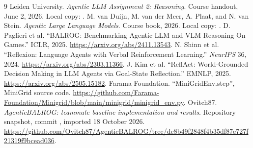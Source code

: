 \documentclass[11pt,a4paper]{article}
\begin{document}
\begin{thebibliography}{9}
 Leiden University. \emph{Agentic LLM Assignment 2: Reasoning}. Course handout, June 2, 2026. Local copy: .
 M. van Duijn, M. van der Meer, A. Plaat, and N. van Stein. \emph{Agentic Large Language Models}. Course book, 2026. Local copy: .
 D. Paglieri et al. ``BALROG: Benchmarking Agentic LLM and VLM Reasoning On Games.'' ICLR, 2025. \url{https://arxiv.org/abs/2411.13543}.
 N. Shinn et al. ``Reflexion: Language Agents with Verbal Reinforcement Learning.'' \emph{NeurIPS} 36, 2024. \url{https://arxiv.org/abs/2303.11366}.
 J. Kim et al. ``ReflAct: World-Grounded Decision Making in LLM Agents via Goal-State Reflection.'' EMNLP, 2025. \url{https://arxiv.org/abs/2505.15182}.
 Farama Foundation. ``MiniGridEnv.step'', MiniGrid source code. \url{https://github.com/Farama-Foundation/Minigrid/blob/main/minigrid/minigrid_env.py}.
 Ovitch87. \emph{AgenticBALROG: teammate baseline implementation and results}. Repository snapshot, commit , imported 18 October 2026. \url{https://github.com/Ovitch87/AgenticBALROG/tree/dc8b49f2848f4b35df87e727f21319f9bcead036}.
\end{thebibliography}
\end{document}
